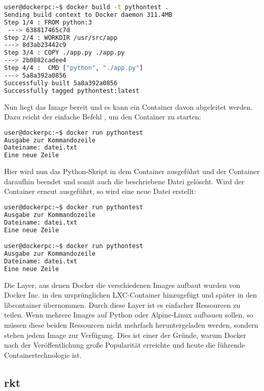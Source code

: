\begin{lstlisting}[language=bash,caption={Terminalausgabe docker build},label={code:dockerbuild}]
user@dockerpc:~$ docker build -t pythontest .
Sending build context to Docker daemon 311.4MB
Step 1/4 : FROM python:3
 ---> 638817465c7d
Step 2/4 : WORKDIR /usr/src/app
---> 8d3ab23442c9
Step 3/4 : COPY ./app.py ./app.py
---> 2b0882cadee4
Step 4/4 :  CMD ["python", "./app.py"]
---> 5a8a392a0856
Successfully built 5a8a392a0856
Successfully tagged pythontest:latest
\end{lstlisting}

Nun liegt das Image bereit und es kann ein Container davon abgeleitet werden. Dazu reicht der einfache Befehl , um den Container zu starten:

\begin{lstlisting}[language=bash,caption={Terminalausgabe docker run},label={code:dockerbuild}]
user@dockerpc:~$ docker run pythontest
Ausgabe zur Kommandozeile
Dateiname: datei.txt
Eine neue Zeile
\end{lstlisting}

Hier wird nun das Python-Skript in dem Container ausgeführt und der Container daraufhin beendet und somit auch die beschriebene Datei gelöscht. Wird der Container erneut ausgeführt, so wird eine neue Datei erstellt:

\begin{lstlisting}[language=bash,caption={Terminalausgabe docker run mehrfach},label={code:dockerbuild}]
user@dockerpc:~$ docker run pythontest
Ausgabe zur Kommandozeile
Dateiname: datei.txt
Eine neue Zeile

user@dockerpc:~$ docker run pythontest
Ausgabe zur Kommandozeile
Dateiname: datei.txt
Eine neue Zeile
\end{lstlisting}

Die Layer, aus denen Docker die verschiedenen Images aufbaut wurden von Docker Inc. in den ursprünglichen \ac{LXC}-Container hinzugefügt und später in den libcontainer übernommen. Durch diese Layer ist es einfacher Ressourcen zu teilen. Wenn mehrere Images auf Python oder Alpine-Linux aufbauen sollen, so müssen diese beiden Ressourcen nicht mehrfach heruntergeladen werden, sondern stehen jedem Image zur Verfügung. Dies ist einer der Gründe, warum Docker nach der Veröffentlichung große Popularität erreichte und heute die führende Containertechnologie ist. \citep{dockermilestones}



\subsection*{rkt}
\label{sec:rkt}

